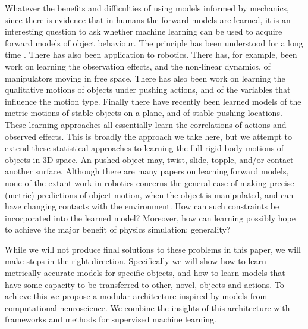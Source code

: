 Whatever the benefits and difficulties of using models informed by mechanics, since there is evidence that in humans the forward models are learned, it is an interesting question to ask whether machine learning can be used to acquire forward models of object behaviour. The principle has been understood for a long time \citep{JordanJacobs90,JordanRumelhart92}. There has also been application to robotics. There has, for example, been work on learning the observation effects, and the non-linear dynamics, of manipulators moving in free space. There has also been work on learning the qualitative motions of objects under pushing actions, and of the variables that influence the motion type. Finally there have recently been learned models of the metric motions of stable objects on a plane, and of stable pushing locations. These learning approaches all essentially learn the correlations of actions and observed effects. This is broadly the approach we take here, but we attempt to extend these statistical approaches to learning the full rigid body motions of objects in 3D space. An pushed object may, twist, slide, topple, and/or contact another surface. Although there are many papers on learning forward models, none of the extant work in robotics concerns the general case of making precise (metric) predictions of object motion, when the object is manipulated, and can have changing contacts with the environment. How can such constraints be incorporated into the learned model? Moreover, how can learning possibly hope to achieve the major benefit of physics simulation: generality? 

While we will not produce final solutions to these problems in this paper, we will make steps in the right direction. Specifically we will show how to learn metrically accurate models for specific objects, and how to learn models that have some capacity to be transferred to other, novel, objects and actions. To achieve this we propose a modular architecture inspired by models from computational neuroscience. We combine the insights of this architecture with frameworks and methods for supervised machine learning. 
